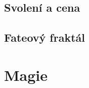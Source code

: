 \documentclass[../main.tex]{subfiles}
\begin{document}
\subsection{Svolení a cena}
\label{sec:spec-svolenicena}


\subsection{Fateový fraktál}
\label{sec:spec-fraktal}

\section{Magie}
\label{sec:magie}
\end{document}
